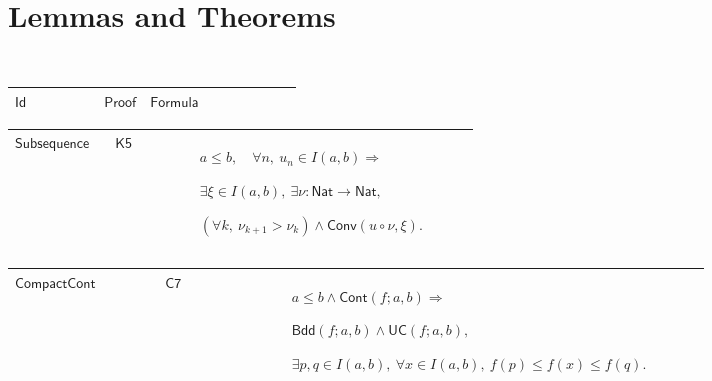 \documentclass[12pt,reqno]{amsart}
\theoremstyle{blueplain}
\numberwithin{equation}{section}
\newlength{\FTCOneColumnBody}
\begin{document}
{\scriptsize \ }

\section{\protect\scriptsize Lemmas and Theorems}

{\scriptsize {\ }}

{\scriptsize \setlength{\parskip}{0pt}\nointerlineskip
\noindent 
\begin{tabular}{|@{}>{\centering\arraybackslash}m{\FTCOneColumnBody}|}
\hline
$\displaystyle \mathsf{Lemmas}$ \\ \hline
\end{tabular}%
}

{\scriptsize \setlength{\parskip}{0pt}\nointerlineskip
\noindent 
\begin{tabular}{|@{}>{\centering\arraybackslash}m{0.19251\linewidth}|>{\centering\arraybackslash}m{0.16845\linewidth}|>{\centering\arraybackslash}m{0.53904\linewidth}|}
\hline
$\displaystyle \mathsf{Id}$ & $\displaystyle \mathsf{Proof}$ & $%
\displaystyle \mathsf{Formula}$ \\ \hline
\end{tabular}%
}

{\scriptsize \setlength{\parskip}{0pt}\nointerlineskip
\noindent 
\begin{tabular}{|@{}>{\centering\arraybackslash}m{0.19251\linewidth}|>{\centering\arraybackslash}m{0.16845\linewidth}|>{\centering\arraybackslash}m{0.53904\linewidth}|}
\hline
\hypertarget{lem:Subsequence}{$\displaystyle \mathsf{Subsequence}$} & 
\hyperlink{proof:K5}{$\displaystyle \mathsf{K5}$} & $\displaystyle a\le
b,\quad\forall n,\ u_n\in I(a,b)\Rightarrow$\par$\displaystyle \exists\xi\in
I(a,b),\ \exists\nu:\mathsf{Nat}\to\mathsf{Nat},$\par$\displaystyle (\forall
k,\ \nu_{k+1}>\nu_k)\land\mathsf{Conv}(u\circ\nu,\xi).$ \\ \hline
\end{tabular}%
}

{\scriptsize \setlength{\parskip}{0pt}\nointerlineskip
\noindent 
\begin{tabular}{|@{}>{\centering\arraybackslash}m{0.19251\linewidth}|>{\centering\arraybackslash}m{0.16845\linewidth}|>{\centering\arraybackslash}m{0.53904\linewidth}|}
\hline
\hypertarget{lem:CompactCont}{$\displaystyle \mathsf{CompactCont}$} & 
\hyperlink{proof:C7}{$\displaystyle \mathsf{C7}$} & $\displaystyle a\le
b\land\mathsf{Cont}(f;a,b)\Rightarrow$\par$\displaystyle \mathsf{Bdd}%
(f;a,b)\land\mathsf{UC}(f;a,b),$\par$\displaystyle \exists p,q\in I(a,b),\
\forall x\in I(a,b),\ f(p)\le f(x)\le f(q).$ \\ \hline
\end{tabular}%
}
\end{document}
